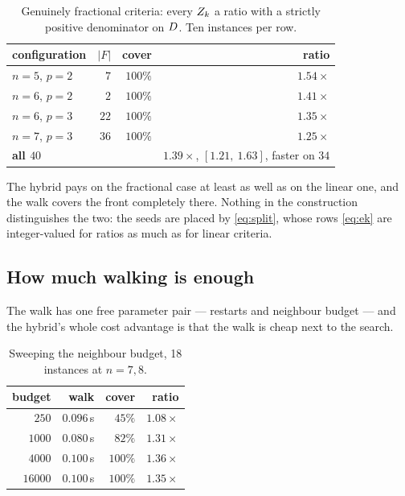 \documentclass[11pt,a4paper]{article}
\begin{document}
\begin{table}[h]
\centering
\caption{Genuinely fractional criteria: every $Z_k$ a ratio with a strictly
positive denominator on $D$.  Ten instances per row.}
\label{tab:frac}
\begin{tabular}{lrrr}
\toprule
configuration & $|F|$ & cover & ratio \\
\midrule
$n=5$, $p=2$ & $7$  & $100\%$ & $1.54\times$ \\
$n=6$, $p=2$ & $2$  & $100\%$ & $1.41\times$ \\
$n=6$, $p=3$ & $22$ & $100\%$ & $1.35\times$ \\
$n=7$, $p=3$ & $36$ & $100\%$ & $1.25\times$ \\
\midrule
\textbf{all $40$} & & & $\mathbf{1.39\times}$, $[1.21,\ 1.63]$, faster on $34$ \\
\bottomrule
\end{tabular}
\end{table}

\noindent
The hybrid pays on the fractional case at least as well as on the linear one,
and the walk covers the front completely there.  Nothing in the construction
distinguishes the two: the seeds are placed by \eqref{eq:split}, whose rows
\eqref{eq:ek} are integer-valued for ratios as much as for linear criteria.

\subsection{How much walking is enough}
\label{sec:cover}

The walk has one free parameter pair --- restarts and neighbour budget --- and
the hybrid's whole cost advantage is that the walk is cheap next to the search.

\begin{table}[h]
\centering
\caption{Sweeping the neighbour budget, 18 instances at $n = 7,8$.}
\label{tab:budget}
\begin{tabular}{rrrr}
\toprule
budget & walk & cover & ratio \\
\midrule
$250$    & $0.096$\,s & $45\%$  & $1.08\times$ \\
$1000$   & $0.080$\,s & $82\%$  & $1.31\times$ \\
$4000$   & $0.100$\,s & $100\%$ & $\mathbf{1.36\times}$ \\
$16000$  & $0.100$\,s & $100\%$ & $1.35\times$ \\
\bottomrule
\end{tabular}
\end{table}
\end{document}
